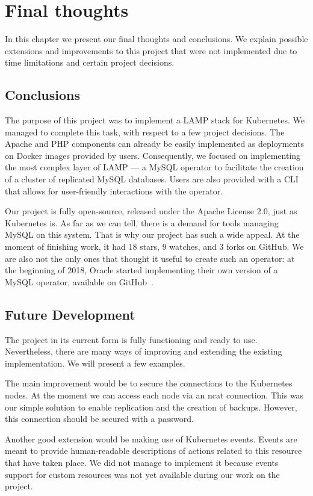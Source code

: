 \chapter{Final thoughts}
In this chapter we present our final thoughts and conclusions. We explain possible extensions
and improvements to this project that were not implemented due to time limitations and certain
project decisions.

\section{Conclusions}
The purpose of this project was to implement a LAMP stack for Kubernetes. We managed to complete
this task, with respect to a few project decisions. The Apache and PHP
components can already be easily implemented as
deployments on Docker images provided by users. Consequently, we focused on implementing the most
complex layer of LAMP --- a MySQL operator to facilitate the creation of a cluster of replicated
MySQL databases. Users are also provided with a CLI that allows for user-friendly interactions with
the operator.

Our project is fully open-source, released under the Apache License 2.0, just as Kubernetes is. As
far as we can tell, there is a demand for tools managing MySQL on this system. That is why our
project has such a wide appeal. At the moment of finishing work, it had 18 stars, 9 watches, and 3
forks on GitHub. We are also not the only ones that thought it useful to create
such an operator: at the beginning of 2018, Oracle started implementing their
own version of a MySQL operator, available on GitHub~\cite{oracle}.

\section{Future Development}
The project in its current form is fully functioning and ready to use. Nevertheless, there are many
ways of improving and extending the existing implementation. We will present a few examples.

The main improvement would be to secure the connections to the Kubernetes nodes. At the moment we
can access each node via an ncat connection. This was our simple solution to enable replication and
the creation of backups. However, this connection should be secured with a password.

Another good extension would be making use of Kubernetes events. Events are meant to provide
human-readable descriptions of actions related to this resource that have taken place. We did not
manage to implement it because events support for custom resources was not yet available during our
work on the project.


